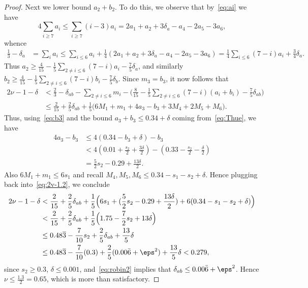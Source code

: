 \begin{proof}
  Next we lower bound $a_2+b_2$. To do this, we observe that by~\eqref{eq:ai} we have
  \[
  4\sum_{i\ge7} a_i \le \sum_{i\ge7}(i-3)a_i = 2a_1+a_2+3\delta_a -a_4-2a_5-3a_6,
  \]
  whence
  \begin{align*}
    \frac{1}{3} -\delta_a&= \sum_{i}a_i
    \le \sum_{i\le 6}a_i +\frac{1}{4}(2a_1+a_2+3\delta_a -a_4-2a_5-3a_6)
    = \frac{1}{4}\sum_{i\le 6}(7-i)a_i +\frac{3}{4}\delta_a.
  \end{align*}
  Thus $a_2 \ge \frac{4}{15} - \frac{1}{5}\sum_{2\neq i\le 6}(7-i)a_i-\frac{7}{5}\delta_a$,
  and similarly $b_2 \ge \frac{4}{15} - \frac{1}{5}\sum_{2\neq i\le 6}(7-i)b_i-\frac{7}{5}\delta_b$. Since $m_3=b_3$, it
  now follows that
  \begin{align}\label{eq:2v-1.2}
    2\nu -1-\delta
    &< \frac{2}{3}-\delta_{ab} -\sum_{2\neq i \le 6}m_i - \Big(\frac{8}{15} - \frac{1}{5}\sum_{2\neq i \le 6}(7-i)(a_i+b_i)-\frac{7}{5}\delta_{ab}\Big) \nonumber\\
    & \le \frac{2}{15} +\frac{2}{5}\delta_{ab}+ \frac{1}{5}\Big(6M_1+m_1 + 4a_3-b_3 +3M_4+2M_5+ M_6\Big).
  \end{align}
  Thus, using~\eqref{eq:b3} and the bound $a_3+b_3\leq 0.34+\delta$ coming from~\eqref{eq:Thue}, we have
  \begin{align*}
    4a_3-b_3 &\le 4(0.34-b_3+\delta)-b_3 \\
    &< 4(0.01+\frac{s_2}{2}+\frac{3\delta}{2}) - (0.33-\frac{s_2}{2}-\frac{\delta}{2})\\
    & = \frac{5}{2}s_2-0.29+\frac{13\delta}{2}.
  \end{align*}
  Also $6M_1+m_1\le 6s_1$ and recall $M_4,M_5,M_6 \le
  0.34-s_1-s_2+\delta$.
  Hence plugging back into~\eqref{eq:2v-1.2}, we conclude
  \begin{align*}
    2\nu -1-\delta
    & < \frac{2}{15}+
    \frac{2}{5}\delta_{ab}
    + \frac{1}{5}\Big(6s_1 + (\frac{5}{2}s_2-0.29+\frac{13\delta}{2})+6(0.34-s_1-s_2+\delta)\Big)\\
    & < \frac{2}{15}+
    \frac{2}{5}\delta_{ab}
    + \frac{1}{5}\Big(1.75-\frac{7}{2}s_2+13\delta\Big)\\
    & \le 0.48\overline{3} - \frac{7}{10}s_2 +\frac{2}{5}\delta_{ab} +\frac{13}{5}\delta \\
    &\le 0.48\overline{3} - \frac{7}{10}(0.3) +\frac{2}{5}(0.00\bar{6}+\eps^2) +\frac{13}{5}\delta< 0.279,
  \end{align*}
  since $s_2\geq 0.3$, $\delta\le 0.001$, and~\eqref{eq:robin2} implies that $\delta_{ab}\leq 0.00\bar{6}+\eps^2$.
  Hence $\nu\le \frac{1.3}{2} = 0.65$, which is more than satisfactory.
\end{proof}

